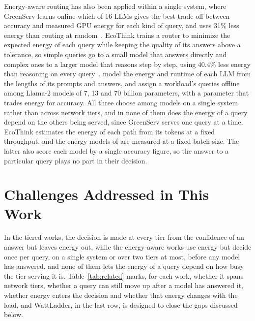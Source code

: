 \documentclass[cic,dipl,english]{infufrgs}
\begin{document}
Energy-aware routing has also been applied within a single system, where GreenServ
learns online which of 16 LLMs gives the best trade-off between accuracy and measured GPU
energy for each kind of query, and uses 31\% less energy than routing at
random~\cite{ziller2026greenserv}. EcoThink trains a router to minimize the expected
energy of each query while keeping the quality of its answers above a tolerance, so
simple queries go to a small model that answers directly and complex ones to a larger
model that reasons step by step, using 40.4\% less energy than reasoning on every
query~\cite{li2026ecothink}.
 model the energy and runtime of each LLM from the lengths
of its prompts and answers, and assign a workload's queries offline among Llama-2 models
of 7, 13 and 70 billion parameters, with a parameter that trades energy for accuracy.
All three choose among models on a single system rather than across network tiers, and
in none of them does the energy of a query depend on the others being served, since
GreenServ serves one query at a time, EcoThink estimates the energy of each path from its
tokens at a fixed throughput, and the energy models of
 are measured at a fixed batch size. The latter also score each
model by a single accuracy figure, so the answer to a particular query plays no part in
their decision.

\section{Challenges Addressed in This Work}
\label{sec:challenges}

In the tiered works, the decision is made at every tier from the confidence of an
answer but leaves energy out, while the energy-aware works use energy but decide once
per query, on a single system or over two tiers at most, before any model has answered,
and none of them lets the energy of a query depend on how busy the tier serving it is.
Table~\ref{tab:related} marks, for each work, whether it spans network tiers, whether a
query can still move up after a model has answered it, whether energy enters the
decision and whether that energy changes with the load, and WattLadder,
in the last row, is designed to close the gaps discussed below.
\end{document}
